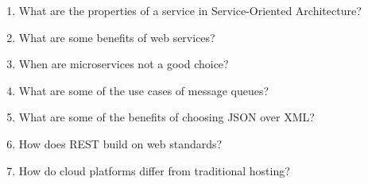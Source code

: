 \begin{enumerate}
\item
What are the properties of a service in Service-Oriented Architecture?

\item
What are some benefits of web services?

\item
When are microservices not a good choice?

\item
What are some of the use cases of message queues?

\item
What are some of the benefits of choosing JSON over XML?

\item
How does REST build on web standards?

\item
How do cloud platforms differ from traditional hosting?
\end{enumerate}